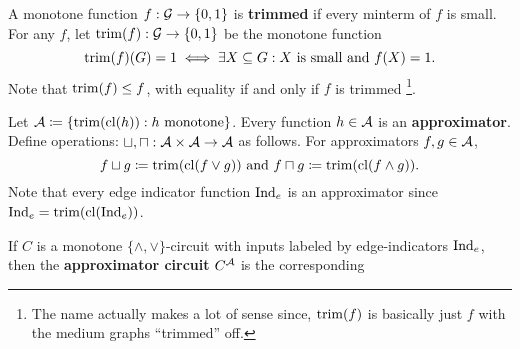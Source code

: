 \documentclass[11pt]{article}
\begin{document}
	A monotone function $f: \mathcal{G} \rightarrow \{0,1\}$ is \textbf{trimmed} if every minterm of $f$ is small. For any $f$, let $\mathrm{trim}(f): \mathcal{G} \rightarrow \{0,1\}$ be the monotone function
	 \[\mathrm{trim}(f)(G) = 1 \iff \exists X \subseteq G: \mbox{$X$ is small and $f(X) = 1$}.\]
	Note that $\mathrm{trim}(f) \leq f$, with equality if and only if $f$ is trimmed \footnote{The name actually makes a lot of sense since, $\mathrm{trim}(f)$ is basically just $f$ with the medium graphs ``trimmed'' off.}. 
	 
	Let $\mathcal{A} \coloneqq\{\mathrm{trim}(\mathrm{cl}(h)): h \mbox{ monotone}\}$. Every function $h \in \mathcal{A}$ is an \textbf{approximator}. Define operations: $\sqcup, \sqcap: \mathcal{A} \times \mathcal{A} \rightarrow \mathcal{A}$ as follows. For approximators $f, g \in \mathcal{A}$,
	\[f\sqcup g\coloneqq \mathrm{trim}(\mathrm{cl}(f \lor g)) \mbox{ and } f \sqcap g\coloneqq \mathrm{trim}(\mathrm{cl}(f\land g)).\]
	Note that every edge indicator function $\mathrm{Ind}_e$ is an approximator since $\mathrm{Ind}_e = \mathrm{trim}(\mathrm{cl}(\mathrm{Ind}_e))$. 
	 
	If $C$ is a monotone $\{\land, \lor\}$-circuit with inputs labeled by edge-indicators $\mathrm{Ind}_e$, then the \textbf{approximator circuit} $C^{\mathcal{A}}$ is the corresponding 
	 
\end{document}
